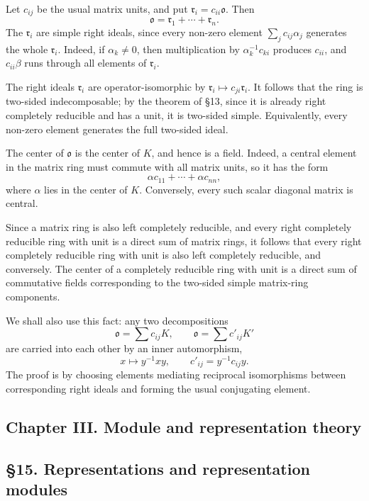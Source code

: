 \documentclass[
  11pt,
]{article}
\begin{document}
Let \(c_{ij}\) be the usual matrix units, and put
\(\mathfrak r_i=c_{ii}\mathfrak{o}\). Then \[
  \mathfrak{o}=\mathfrak r_1+\cdots+\mathfrak r_n.
\] The \(\mathfrak r_i\) are simple right ideals, since every non-zero
element \(\sum_j c_{ij}\alpha_j\) generates the whole \(\mathfrak r_i\).
Indeed, if \(\alpha_k\ne0\), then multiplication by
\(\alpha_k^{-1}c_{ki}\) produces \(c_{ii}\), and \(c_{ii}\beta\) runs
through all elements of \(\mathfrak r_i\).

The right ideals \(\mathfrak r_i\) are operator-isomorphic by
\(\mathfrak r_i\mapsto c_{ji}\mathfrak r_i\). It follows that the ring
is two-sided indecomposable; by the theorem of §13, since it is already
right completely reducible and has a unit, it is two-sided simple.
Equivalently, every non-zero element generates the full two-sided ideal.

The center of \(\mathfrak{o}\) is the center of \(K\), and hence is a
field. Indeed, a central element in the matrix ring must commute with
all matrix units, so it has the form \[
  \alpha c_{11}+\cdots+\alpha c_{nn},
\] where \(\alpha\) lies in the center of \(K\). Conversely, every such
scalar diagonal matrix is central.

Since a matrix ring is also left completely reducible, and every right
completely reducible ring with unit is a direct sum of matrix rings, it
follows that every right completely reducible ring with unit is also
left completely reducible, and conversely. The center of a completely
reducible ring with unit is a direct sum of commutative fields
corresponding to the two-sided simple matrix-ring components.

We shall also use this fact: any two decompositions \[
  \mathfrak{o}=\sum c_{ij}K,
  \qquad
  \mathfrak{o}=\sum c'_{ij}K'
\] are carried into each other by an inner automorphism, \[
  x\mapsto y^{-1}xy,
  \qquad
  c'_{ij}=y^{-1}c_{ij}y.
\] The proof is by choosing elements mediating reciprocal isomorphisms
between corresponding right ideals and forming the usual conjugating
element.

\subsection{Chapter III. Module and representation
theory}\label{chapter-iii.-module-and-representation-theory}

\subsection{§15. Representations and representation
modules}\label{representations-and-representation-modules}
\end{document}
